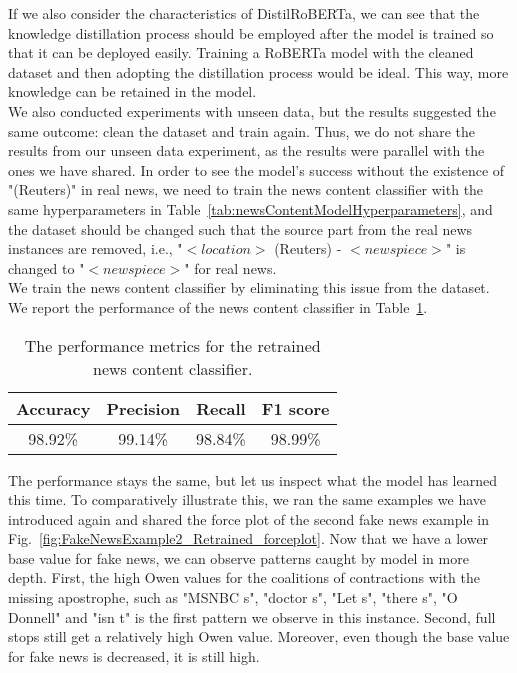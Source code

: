If we also consider the characteristics of DistilRoBERTa, we can see that the knowledge distillation process should be employed after the model is trained so that it can be deployed easily. Training a RoBERTa model with the cleaned dataset and then adopting the distillation process would be ideal. This way, more knowledge can be retained in the model.\\
We also conducted experiments with unseen data, but the results suggested the same outcome: clean the dataset and train again. Thus, we do not share the results from our unseen data experiment, as the results were parallel with the ones we have shared. In order to see the model's success without the existence of "(Reuters)" in real news, we need to train the news content classifier with the same hyperparameters in Table~\ref{tab:newsContentModelHyperparameters}, and the dataset should be changed such that the source part from the real news instances are removed, i.e., "$<location>$ (Reuters) -  $<newspiece>$" is changed to "$<newspiece>$" for real news.\\
We train the news content classifier by eliminating this issue from the dataset. We report the performance of the news content classifier in Table~\ref{tab:newsContentModelRetrainedPerformanceMetrics}.
\begin{table}
    \centering
    \begin{tabular}{c | c | c | c}
        \textbf{Accuracy} & \textbf{Precision} & \textbf{Recall} & \textbf{F1 score} \\
        \hline
        98.92\%           & 99.14\%            & 98.84\%         & 98.99\%           \\
    \end{tabular}
    \caption[The performance metrics for the retrained news content classifier.]{The performance metrics for the retrained news content classifier.}
    \label{tab:newsContentModelRetrainedPerformanceMetrics}
\end{table}
The performance stays the same, but let us inspect what the model has learned this time. To comparatively illustrate this, we ran the same examples we have introduced again and shared the force plot of the second fake news example in Fig.~\ref{fig:FakeNewsExample2_Retrained_forceplot}. Now that we have a lower base value for fake news, we can observe patterns caught by model in more depth. First, the high Owen values for the coalitions of contractions with the missing apostrophe, such as "MSNBC s", "doctor s", "Let s", "there s", "O Donnell" and "isn t" is the first pattern we observe in this instance. Second, full stops still get a relatively high Owen value. Moreover, even though the base value for fake news is decreased, it is still high.
